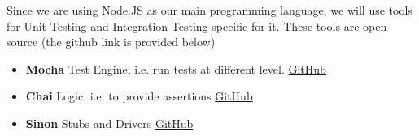 Since we are using Node.JS as our main programming language, we will use tools for Unit Testing and Integration Testing specific for it.
These tools are open-source (the github link is provided below)
\begin{itemize}
\item \textbf{Mocha} Test Engine, i.e. run tests at different level. \href{https://github.com/mochajs/mocha}{GitHub}
\item \textbf{Chai} Logic, i.e. to provide assertions \href{https://github.com/chaijs/chai}{GitHub}
\item \textbf{Sinon} Stubs and Drivers \href{https://github.com/sinonjs/sinon}{GitHub}
\end{itemize}